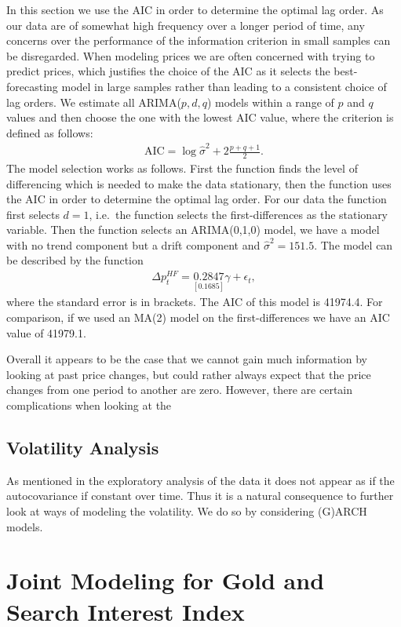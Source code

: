 \documentclass[a4paper]{article}
\theoremstyle{definition}
\begin{document}
In this section we use the AIC in order to determine the optimal lag order. As our data are of somewhat high frequency over a longer period of time, any concerns over the performance of the information criterion in small samples can be disregarded. When modeling prices we are often concerned with trying to predict prices, which justifies the choice of the AIC as it selects the best-forecasting model in large samples rather than leading to a consistent choice of lag orders. We estimate all ARIMA($p,d,q$) models within a range of $p$ and $q$ values and then choose the one with the lowest AIC value, where the criterion is defined as follows:
	\begin{align*}
	\text{AIC} = \log \hat\sigma^2 + 2 \frac{p+q+1}{2}.
	\end{align*}
The model selection works as follows. First the function finds the level of differencing which is needed to make the data stationary, then the function uses the AIC in order to determine the optimal lag order. For our data the function first selects $d=1$, i.e.\ the function selects the first-differences as the stationary variable. Then the function selects an ARIMA(0,1,0) model,  we have a model with no trend component but a drift component and $\hat\sigma^2 = 151.5$. The model can be described by the function
	\begin{align*}
	\Delta p^{HF}_{t} = \underset{[0.1685]}{0.2847} \gamma + \epsilon_{t},
	\end{align*}
where the standard error is in brackets. The AIC of this model is 41974.4. For comparison, if we used an MA(2) model on the first-differences we have an AIC value of 41979.1. 

Overall it appears to be the case that we cannot gain much information by looking at past price changes, but could rather always expect that the price changes from one period to another are zero. However, there are certain complications when looking at the 
\subsection{Volatility Analysis}
As mentioned in the exploratory analysis of the data it does not appear as if the autocovariance if constant over time. Thus it is a natural consequence to further look at ways of modeling the volatility. We do so by considering (G)ARCH models.
\newpage
\section{Joint Modeling for Gold and Search Interest Index}
\end{document}
